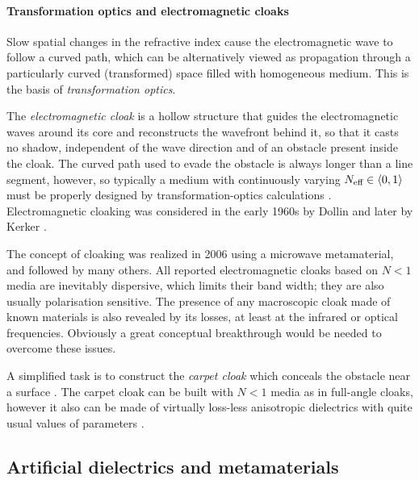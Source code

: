 \paragraph{Transformation optics and electromagnetic cloaks} %
Slow spatial changes in the refractive index cause the electromagnetic wave to follow a curved path, which can be alternatively viewed as propagation through a particularly curved (transformed) space filled with homogeneous medium. This is the basis of \textit{transformation optics}.

The \textit{electromagnetic cloak} is a hollow structure that guides the electromagnetic waves around its core and reconstructs the wavefront behind it, so that it casts no shadow, independent of the wave direction and of an obstacle present inside the cloak. 
The curved path used to evade the obstacle is always longer than a line segment, however, so typically a medium with continuously varying $N_{\text{eff} }\in \langle0,1\rangle$ must be properly designed by transformation-optics calculations \cite{eleftheriades2012transforming}.
Electromagnetic cloaking %
was considered in the early 1960s by Dollin \cite{dollin1961possibility} and later by Kerker \cite{kerker1975invisible}.

The concept of cloaking was realized \cite{schurig2006metamaterial} in 2006 using a microwave metamaterial, and followed by many others.
All reported electromagnetic cloaks based on $N<1$ media are inevitably dispersive, which limits their band width; they are also usually polarisation sensitive. The presence of any macroscopic cloak made of known materials is also revealed by its losses, at least at the infrared or optical frequencies. Obviously a great conceptual breakthrough would be needed to overcome these issues. 

A simplified task is to construct the \textit{carpet cloak} which conceals the obstacle near a surface \cite{valentine2009optical}.
The carpet cloak can be built with $N<1$ media as in full-angle cloaks, however it also can be made of virtually loss-less anisotropic dielectrics with quite usual values of parameters \cite{wang2013homogeneous}.


\subsection{Artificial dielectrics and metamaterials} 
